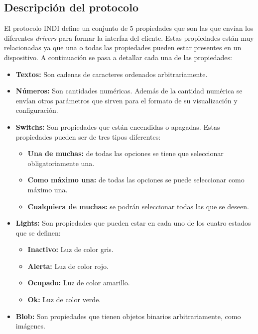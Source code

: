 \subsection{Descripción del protocolo}
El protocolo INDI define un conjunto de 5 propiedades que son las que envían los diferentes \textit{drivers} para formar la interfaz del cliente. Estas propiedades están muy relacionadas ya que una o todas las propiedades pueden estar presentes en un dispositivo. A continuación se pasa a detallar cada una de las propiedades:
\begin{itemize}
  \item \textbf{Textos:} Son cadenas de caracteres ordenados arbitrariamente.
  \item \textbf{Números:} Son cantidades numéricas. Además de la cantidad numérica se envían otros parámetros que sirven para el formato de su visualización y configuración.
  \item \textbf{Switchs:} Son propiedades que están encendidas o apagadas. Estas propiedades pueden ser de tres tipos diferentes:
    \begin{itemize}
      \item \textbf{Una de muchas:} de todas las opciones se tiene que seleccionar obligatoriamente una.
	    \item \textbf{Como máximo una:} de todas las opciones se puede seleccionar como máximo una.
	    \item \textbf{Cualquiera de muchas:} se podrán seleccionar todas las que se deseen.
    \end{itemize}
  \item \textbf{Lights:} Son propiedades que pueden estar en cada uno de los cuatro estados que se definen:
    \begin{itemize}
      \item \textbf{Inactivo:} Luz de color gris.
      \item \textbf{Alerta:} Luz de color rojo.
      \item\textbf{Ocupado:} Luz de color amarillo.
      \item \textbf{Ok:} Luz de color verde.
    \end{itemize}
  \item \textbf{Blob:} Son propiedades que tienen objetos binarios arbitrariamente, como imágenes.
\end{itemize}

